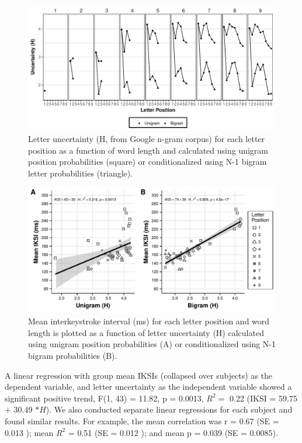 \documentclass[,man,floatsintext]{apa6}
\begin{document}
\begin{figure}
\centering
\includegraphics{v2-manuscript_files/figure-latex/figure3-1.pdf}
\caption{\label{fig:figure3}Letter uncertainty (H, from Google n-gram corpus) for each letter position as a function of word length and calculated using unigram position probabilities (square) or conditionalized using N-1 bigram letter probabilities (triangle).}
\end{figure}



\begin{figure}
\centering
\includegraphics{v2-manuscript_files/figure-latex/figure4-1.pdf}
\caption{\label{fig:figure4}Mean interkeystroke interval (ms) for each letter position and word length is plotted as a function of letter uncertainty (H) calculated using unigram position probabilities (A) or conditionalized using N-1 bigram probabilities (B).}
\end{figure}



A linear regression with group mean IKSIs (collapsed over subjects) as the dependent variable, and letter uncertainty as the independent variable showed a significant positive trend, F(1, 43) = 11.82, p = 0.0013, \(R^2 =\) 0.22 (IKSI = 59.75 \(+\) 30.49 \(* H\)). We also conducted separate linear regressions for each subject and found similar results. For example, the mean correlation was r = 0.67 (SE = 0.013 ); mean \(R^2\) = 0.51 (SE = 0.012 ); and mean p = 0.039 (SE = 0.0085).
\end{document}
